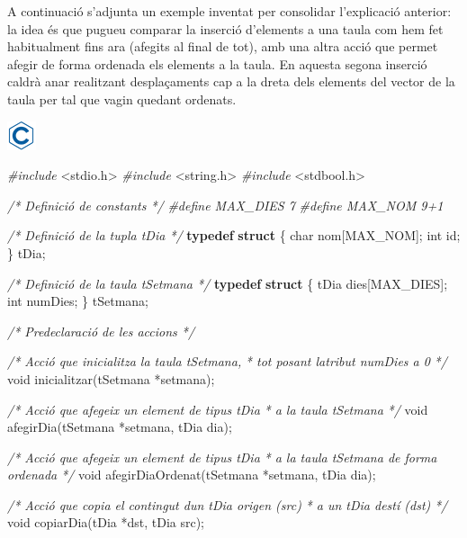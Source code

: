 \documentclass[
]{book}
\newenvironment{Shaded}{\begin{snugshade}}{\end{snugshade}}
\newcommand{\CommentTok}[1]{\textcolor[rgb]{0.56,0.35,0.01}{\textit{#1}}}
\newcommand{\DataTypeTok}[1]{\textcolor[rgb]{0.13,0.29,0.53}{#1}}
\newcommand{\ImportTok}[1]{#1}
\newcommand{\KeywordTok}[1]{\textcolor[rgb]{0.13,0.29,0.53}{\textbf{#1}}}
\newcommand{\NormalTok}[1]{#1}
\newcommand{\PreprocessorTok}[1]{\textcolor[rgb]{0.56,0.35,0.01}{\textit{#1}}}
\begin{document}
A continuació s'adjunta un exemple inventat per consolidar l'explicació anterior: la idea és que pugueu comparar la inserció d'elements a una taula com hem fet habitualment fins ara (afegits al final de tot), amb una altra acció que permet afegir de forma ordenada els elements a la taula. En aquesta segona inserció caldrà anar realitzant desplaçaments cap a la dreta dels elements del vector de la taula per tal que vagin quedant ordenats.

\includegraphics{./img/c.png}

\begin{Shaded}
\begin{Highlighting}[]
\PreprocessorTok{\#include }\ImportTok{\textless{}stdio.h\textgreater{}}
\PreprocessorTok{\#include }\ImportTok{\textless{}string.h\textgreater{}}
\PreprocessorTok{\#include }\ImportTok{\textless{}stdbool.h\textgreater{}}

\CommentTok{/* Definició de constants */}
\PreprocessorTok{\#define MAX\_DIES 7}
\PreprocessorTok{\#define MAX\_NOM 9+1}

\CommentTok{/* Definició de la tupla tDia */}
\KeywordTok{typedef} \KeywordTok{struct}\NormalTok{ \{}
    \DataTypeTok{char}\NormalTok{ nom[MAX\_NOM];}
    \DataTypeTok{int}\NormalTok{ id;}
\NormalTok{\} tDia;}

\CommentTok{/* Definició de la taula tSetmana */}
\KeywordTok{typedef} \KeywordTok{struct}\NormalTok{ \{}
\NormalTok{    tDia dies[MAX\_DIES];}
    \DataTypeTok{int}\NormalTok{ numDies;}
\NormalTok{\} tSetmana;}

\CommentTok{/* Predeclaració de les accions */}

\CommentTok{/* Acció que inicialitza la taula tSetmana,}
\CommentTok{ * tot posant l\textquotesingle{}atribut numDies a 0 }
\CommentTok{ */}
\DataTypeTok{void}\NormalTok{ inicialitzar(tSetmana *setmana);}

\CommentTok{/* Acció que afegeix un element de tipus tDia}
\CommentTok{ * a la taula tSetmana }
\CommentTok{ */}
\DataTypeTok{void}\NormalTok{ afegirDia(tSetmana *setmana, tDia dia);}

\CommentTok{/* Acció que afegeix un element de tipus tDia}
\CommentTok{ * a la taula tSetmana de forma ordenada }
\CommentTok{ */}
\DataTypeTok{void}\NormalTok{ afegirDiaOrdenat(tSetmana *setmana, tDia dia);}

\CommentTok{/* Acció que copia el contingut d\textquotesingle{}un tDia origen (src)}
\CommentTok{ * a un tDia destí (dst) }
\CommentTok{ */}
\DataTypeTok{void}\NormalTok{ copiarDia(tDia *dst, tDia src);}


\end{Highlighting}
\end{Shaded}
\end{document}
